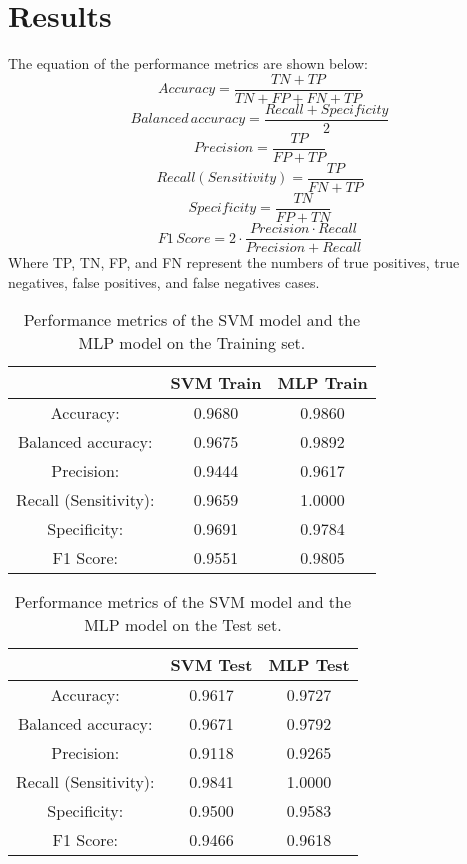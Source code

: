 \section{Results}%
The equation of the performance metrics are shown below:
\begin{equation}
Accuracy=\frac{TN+TP}{TN+FP+FN+TP}
\end{equation}
\begin{equation}
Balanced\,accuracy=\frac{Recall+Specificity}{2}
\end{equation}
\begin{equation}
Precision=\frac{TP}{FP+TP}
\end{equation}
\begin{equation}
Recall (Sensitivity)=\frac{TP}{FN+TP}
\end{equation}
\begin{equation}
Specificity=\frac{TN}{FP+TN}
\end{equation}
\begin{equation}
F1\,Score=2\cdot\frac{Precision\cdot Recall}{Precision+Recall}
\end{equation}
Where TP, TN, FP, and FN represent the numbers of true positives, true negatives, false positives, and false negatives cases.

\begin{table}[h]
\centering
\begin{tabular}{|c|c|c|}
\hline
\ & \textbf{SVM Train} & \textbf{MLP Train} \\
\hline
Accuracy: &0.9680 &0.9860 \\
Balanced accuracy: &0.9675  &0.9892 \\
Precision: &0.9444  &0.9617 \\ 
Recall (Sensitivity): &0.9659 &1.0000 \\
Specificity: &0.9691 &0.9784  \\
F1 Score: &0.9551 &0.9805 \\
\hline
\end{tabular}
\caption{Performance metrics of the SVM model and the MLP model on the Training set.}
\label{tab:example1}
\end{table}


\begin{table}[h]
\centering
\begin{tabular}{|c|c|c|}
\hline
\ & \textbf{SVM Test} & \textbf{MLP Test} \\
\hline
Accuracy: &0.9617 &0.9727\\
Balanced accuracy:  &0.9671 &0.9792\\
Precision:  &0.9118 &0.9265\\ 
Recall (Sensitivity):  &0.9841 &1.0000\\
Specificity:  &0.9500 &0.9583\\
F1 Score:  &0.9466 &0.9618\\
\hline
\end{tabular}
\caption{Performance metrics of the SVM model and the MLP model on the Test set.}
\label{tab:example2}
\end{table}

